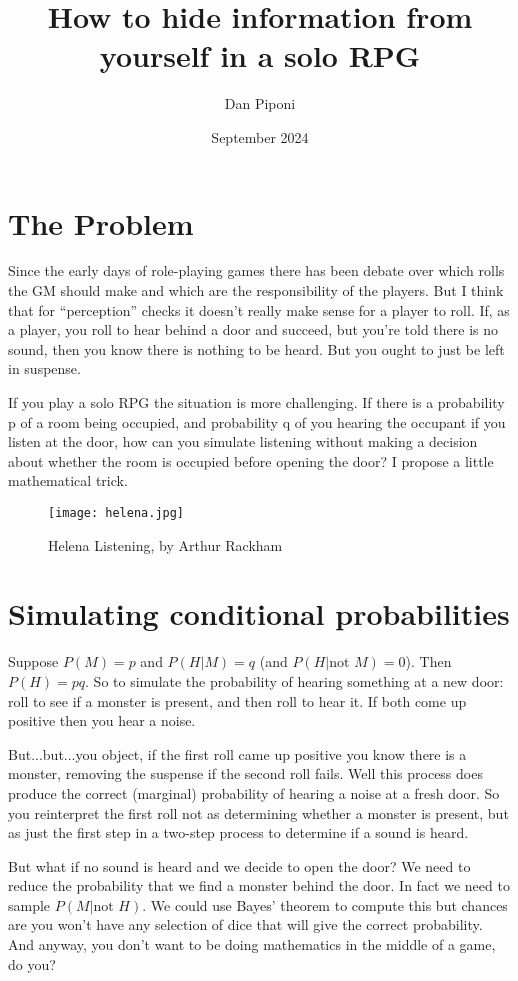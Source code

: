 \documentclass[12pt]{article}
\title{How to hide information from yourself in a solo RPG}
\author{Dan Piponi}
\date{September 2024}
\begin{document}
\maketitle

\section{The Problem}
Since the early days of role-playing games there has been debate over which rolls the GM should make and which are the responsibility of the players.
But I think that for ``perception'' checks it doesn't really make sense for a player to roll.
If, as a player, you roll to hear behind a door and succeed, but you're told there is no sound, then you know there is nothing to be heard.
But you ought to just be left in suspense.

If you play a solo RPG the situation is more challenging. If there is a probability p of a room being occupied, and probability q of you hearing the occupant if you listen at the door, how can you simulate listening without making a decision about whether the room is occupied before opening the door? I propose a little mathematical trick.

\begin{figure*}
\centering
\texttt{[image: helena.jpg]}
\caption{Helena Listening, by Arthur Rackham}
\end{figure*}

\section{Simulating conditional probabilities}
Suppose $P(M)=p$ and $P(H|M)=q$ (and $P(H|\mbox{not }M)=0$).
Then $P(H) = pq$.
So to simulate the probability of hearing something at a new door: roll to see if a monster is present, and then roll to hear it.
If both come up positive then you hear a noise.

But...but...you object, if the first roll came up positive you know there is a monster, removing the suspense if the second roll fails.
Well this process does produce the correct (marginal) probability of hearing a noise at a fresh door.
So you reinterpret the first roll not as determining whether a monster is present, but as just the first step in a two-step process to determine if a sound is heard.

But what if no sound is heard and we decide to open the door?
We need to reduce the probability that we find a monster behind the door.
In fact we need to sample $P(M|\mbox{not }H)$.
We could use Bayes' theorem to compute this but chances are you won't have any selection of dice that will give the correct probability.
And anyway, you don't want to be doing mathematics in the middle of a game, do you?
\end{document}
